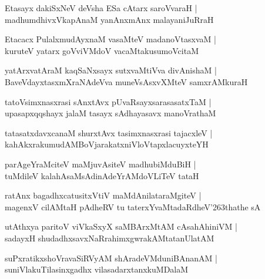 \documentclass[twoside,12pt,openright]{book}
\def\S{\char'263}
\newcounter{shloka}[chapter]
\begin{document}
\begin{shloka}%
Etasayx dakiSxNeV deVsha ESa cAtarx saroVvaraH |\\
madhumdhivxVkapAnaM yanAnxmAnx malayaniJuRraH 
\end{shloka}

\begin{shloka}%
Etacacx PulalxmudAyxnaM vasaMteV madanoVtasxvaM |\\
kuruteV yatarx goVviVMdoV vacaMtakusumoVcitaM 
\end{shloka}

\begin{shloka}%
yatArxvatAraM kaqSaNxsayx sutxvaMtiVva divAnishaM |\\
BaveVdayxtasxmXraNAdeVva muneVsAsxvXMteV samxrAMkuraH 
\end{shloka}

\begin{shloka}%
tatoVsimxnasxrasi sAnxtAvx pUvaRsayxsarasasatxTaM |\\
upasapxqqshayx jalaM tasayx sAdhayasavx manoVrathaM 
\end{shloka}

\begin{shloka}%
tatasatxdavxcanaM shurxtAvx tasimxnasxrasi tajacxleV |\\
kahAkxrakumudAMBoVjarakatxniVloVtapxlacuyxteYH 
\end{shloka}

\begin{shloka}%
parAgeYraMciteV maMjuvAsiteV madhubiMduBiH |\\
tuMdileV kalahAsaMsAdinAdeYrAMdoVLiTeV tataH 
\end{shloka}

\begin{shloka}%
ratAnx bagadhxcatusitxVtiV maMdAnilataraMgiteV |\\
magenxV cilAMtaH pAdheRV tu taterxYvaMtadaRdheV\S thathe sA
\end{shloka}

\begin{shloka}%
utAthxya paritoV viVkaSxyX saMBArxMtAM cAsahAhiniVM |\\
sadayxH shudadhxsavxNaRrahimxgwrakAMtatanUlatAM
\end{shloka}

\begin{shloka}%
suPxratikxshoVravaSiRVyAM shAradeVMduniBAnanAM |\\
suniVlakuTilasinxgadhx vilasadarxtanxkuMDalaM 
\end{shloka}
\end{document}
